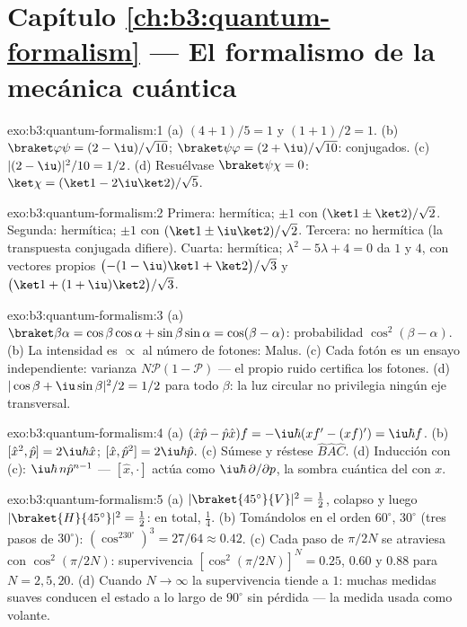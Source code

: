 \section*{Capítulo \ref{ch:b3:quantum-formalism} --- El formalismo de la mecánica cuántica}

\begin{solution}{exo:b3:quantum-formalism:1}
(a) $(4 + 1)/5 = 1$ y $(1 + 1)/2 = 1$. (b) $\braket\varphi\psi =
(2 - \iu)/\sqrt{10}$; $\braket\psi\varphi = (2 + \iu)/\sqrt{10}$:
conjugados. (c) $|(2 - \iu)|^2/10 = 1/2$. (d) Resuélvase
$\braket\psi\chi = 0$: $\ket\chi = (\ket1 - 2\iu\ket2)/\sqrt5$.
\end{solution}

\begin{solution}{exo:b3:quantum-formalism:2}
Primera: hermítica; $\pm1$ con $(\ket1 \pm \ket2)/\sqrt2$. Segunda:
hermítica; $\pm1$ con $(\ket1 \pm \iu\ket2)/\sqrt2$. Tercera: no
hermítica (la transpuesta conjugada difiere). Cuarta: hermítica;
$\lambda^2 - 5\lambda + 4 = 0$ da $1$ y $4$, con vectores propios
$\big({-(1 - \iu)}\ket1 + \ket2\big)/\sqrt3$ y $\big(\ket1 +
(1 + \iu)\ket2\big)/\sqrt3$.
\end{solution}

\begin{solution}{exo:b3:quantum-formalism:3}
(a) $\braket\beta\alpha = \cos\beta\cos\alpha + \sin\beta\sin\alpha
= \cos(\beta - \alpha)$: probabilidad $\cos^2(\beta - \alpha)$. (b)
La intensidad es $\propto$ al número de fotones: Malus. (c) Cada fotón es
un ensayo independiente: varianza $N\mathcal P(1 - \mathcal P)$ --- el
propio ruido certifica los fotones. (d) $|\cos\beta + \iu\sin\beta|^2/2
= 1/2$ para todo $\beta$: la luz circular no privilegia ningún eje
transversal.
\end{solution}

\begin{solution}{exo:b3:quantum-formalism:4}
(a) $(\hat x\hat p - \hat p\hat x)f = -\iu\hbar(xf' - (xf)') =
\iu\hbar f$. (b) $[\hat x^2, \hat p] = 2\iu\hbar\hat x$; $[\hat x,
\hat p^2] = 2\iu\hbar\hat p$. (c) Súmese y réstese $\hat B\hat A
\hat C$. (d) Inducción con (c): $\iu\hbar\,n\hat p^{n-1}$ ---
$[\hat x, \cdot]$ actúa como $\iu\hbar\,\partial/\partial p$, la
sombra cuántica del  con $x$.
\end{solution}

\begin{solution}{exo:b3:quantum-formalism:5}
(a) $|\braket{45^\circ}{V}|^2 = \tfrac12$, colapso y luego
$|\braket{H}{45^\circ}|^2 = \tfrac12$: en total, $\tfrac14$. (b) Tomándolos
en el orden $60^\circ$, $30^\circ$ (tres pasos de $30^\circ$):
$(\cos^230^\circ)^3 = 27/64 \approx 0.42$. (c) Cada paso de
$\pi/2N$ se atraviesa con $\cos^2(\pi/2N)$: supervivencia $[\cos^2(\pi/2N)]^N
= 0.25$, $0.60$ y $0.88$ para $N = 2, 5, 20$. (d) Cuando $N \to \infty$
la supervivencia tiende a $1$: muchas medidas suaves conducen el estado a
lo largo de $90^\circ$ sin pérdida --- la medida usada como volante.
\end{solution}

